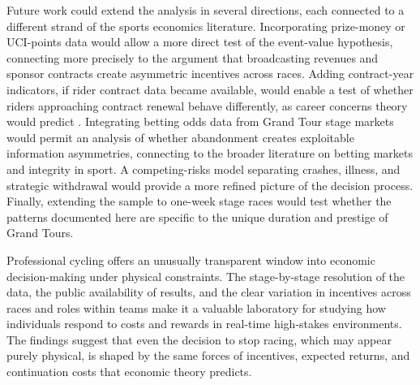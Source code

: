 Future work could extend the analysis in several directions, each connected to a different strand of the sports economics literature. Incorporating prize-money or UCI-points data would allow a more direct test of the event-value hypothesis, connecting more precisely to the argument that broadcasting revenues and sponsor contracts create asymmetric incentives across races. Adding contract-year indicators, if rider contract data became available, would enable a test of whether riders approaching contract renewal behave differently, as career concerns theory would predict \parencite{boeri2008italianjob, kahn1993freeagency}. Integrating betting odds data from Grand Tour stage markets would permit an analysis of whether abandonment creates exploitable information asymmetries, connecting to the broader literature on betting markets and integrity in sport. A competing-risks model separating crashes, illness, and strategic withdrawal would provide a more refined picture of the decision process. Finally, extending the sample to one-week stage races would test whether the patterns documented here are specific to the unique duration and prestige of Grand Tours.

Professional cycling offers an unusually transparent window into economic decision-making under physical constraints. The stage-by-stage resolution of the data, the public availability of results, and the clear variation in incentives across races and roles within teams make it a valuable laboratory for studying how individuals respond to costs and rewards in real-time high-stakes environments. The findings suggest that even the decision to stop racing, which may appear purely physical, is shaped by the same forces of incentives, expected returns, and continuation costs that economic theory predicts.
